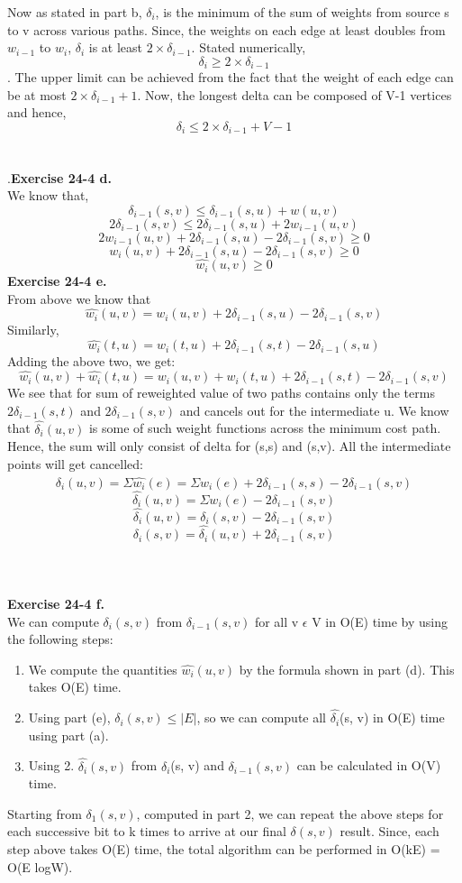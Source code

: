 \documentclass[10pt]{article}
\begin{document}
Now as stated in part b, $\delta_i$, is the minimum of the sum of weights from source s to v across various paths. Since, the weights on each edge at least doubles from $w_{i-1}$ to $w_i$, $\delta_i$ is at least $2\times \delta_{i-1}$. Stated numerically, $$\delta_i \geq 2 \times \delta_{i-1}$$.
The upper limit can be achieved from the fact that the weight of each edge can be at most $2\times \delta_{i-1} +1$. Now, the longest delta can be composed of V-1 vertices and hence, $$\delta_i \leq 2 \times \delta_{i-1} + V - 1$$\\\\.\textbf{Exercise 24-4 d.}\\
We know that, $$\delta_{i-1}(s,v) \leq \delta_{i-1}(s, u) + w(u,v)$$
$$2\delta_{i-1}(s,v) \leq 2\delta_{i-1}(s, u) + 2w_{i-1}(u,v)$$
$$2w_{i-1}(u,v) + 2\delta_{i-1}(s, u) -2\delta_{i-1}(s,v) \geq 0$$
$$w_{i}(u,v) + 2\delta_{i-1}(s, u) -2\delta_{i-1}(s,v) \geq 0$$
$$\widehat{w_{i}}(u,v) \geq 0$$
\textbf{Exercise 24-4 e.}\\
From above we know that $$\widehat{w_i}(u,v) = w_i(u,v) + 2\delta_{i-1}(s,u) - 2\delta_{i-1}(s, v)$$
Similarly, $$\widehat{w_i}(t,u) = w_i(t, u) + 2\delta_{i-1}(s,t) - 2\delta_{i-1}(s, u)$$
Adding the above two, we get:
$$\widehat{w_i}(u,v)+\widehat{w_i}(t,u)  = w_i(u,v) + w_i(t,u) + 2\delta_{i-1}(s,t) - 2\delta_{i-1}(s, v)$$
We see that for sum of reweighted value of two paths contains only the terms $2\delta_{i-1}(s,t)$ and $2\delta_{i-1}(s, v)$ and cancels out for the intermediate u.
We know that $\widehat{\delta_i}(u,v)$ is some of such weight functions across the minimum cost path. Hence, the sum will only consist of delta for (s,s) and (s,v). All the intermediate points will get cancelled:
$$\widehat{\delta_i}(u,v) = \Sigma \widehat{w_i}(e) = \Sigma w_i(e) + 2\delta_{i-1}(s,s) - 2\delta_{i-1}(s,v)$$
$$\widehat{\delta_i}(u,v) = \Sigma w_i(e) - 2\delta_{i-1}(s,v)$$
$$\widehat{\delta_i}(u,v) = \delta_i (s,v) - 2\delta_{i-1}(s,v)$$
$$\delta_i (s,v) = \widehat{\delta_i}(u,v) + 2\delta_{i-1}(s,v)$$\\\\\\
\textbf{Exercise 24-4 f.}\\
We can compute $\delta_i(s, v)$ from $\delta_{i−1}(s, v)$ for all v $\epsilon$ V in O(E) time by using the following steps:
\begin{enumerate}
\item We compute the quantities $\widehat{w_i}(u, v)$ by the formula shown in part (d). This takes O(E) time.
\item Using part (e), $\delta_i(s, v) \leq |E|$, so we can compute all $\widehat{\delta_i}$(s, v) in O(E) time using part (a).
\item Using 2. $\widehat{\delta_i}(s, v)$ from $\delta_i$(s, v) and $\delta_{i−1}(s, v)$ can be calculated in O(V) time.
\end{enumerate}
Starting from $\delta_1(s,v)$, computed in part 2, we can repeat the above steps for each successive bit to k times to arrive at our final $\delta(s,v)$ result. Since, each step above takes O(E) time, the total algorithm can be performed in O(kE) = O(E logW).
\end{document}
